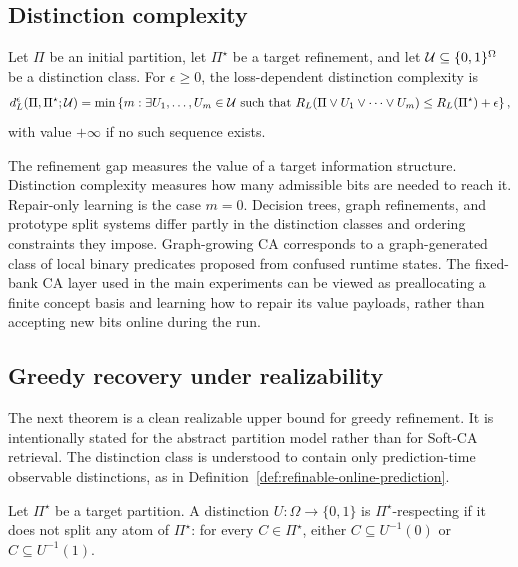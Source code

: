\subsection{Distinction complexity}

\begin{definition}
\label{def:distinction-complexity}
Let $\Pi$ be an initial partition, let $\Pi^\star$ be a target refinement, and let $\mathcal{U}\subseteq\{0,1\}^{\Omega}$ be a distinction class. For $\epsilon\ge0$, the loss-dependent distinction complexity is
\begin{align*}
d_L^\epsilon(\Pi,\Pi^\star;\mathcal{U})
=
\min\left\{
m:
\exists U_1,\ldots,U_m\in\mathcal{U}
\text{ such that }
R_L(\Pi\vee U_1\vee\cdots\vee U_m)
\le
R_L(\Pi^\star)+\epsilon
\right\},
\end{align*}
with value $+\infty$ if no such sequence exists.
\end{definition}

The refinement gap measures the value of a target information structure. Distinction complexity measures how many admissible bits are needed to reach it. Repair-only learning is the case $m=0$. Decision trees, graph refinements, and prototype split systems differ partly in the distinction classes and ordering constraints they impose. Graph-growing CA corresponds to a graph-generated class of local binary predicates proposed from confused runtime states. The fixed-bank CA layer used in the main experiments can be viewed as preallocating a finite concept basis and learning how to repair its value payloads, rather than accepting new bits online during the run.

\subsection{Greedy recovery under realizability}

The next theorem is a clean realizable upper bound for greedy refinement. It is intentionally stated for the abstract partition model rather than for Soft-CA retrieval. The distinction class is understood to contain only prediction-time observable distinctions, as in Definition~\ref{def:refinable-online-prediction}.

\begin{definition}
\label{def:target-respecting}
Let $\Pi^\star$ be a target partition. A distinction $U:\Omega\to\{0,1\}$ is $\Pi^\star$-respecting if it does not split any atom of $\Pi^\star$: for every $C\in\Pi^\star$, either $C\subseteq U^{-1}(0)$ or $C\subseteq U^{-1}(1)$.
\end{definition}

